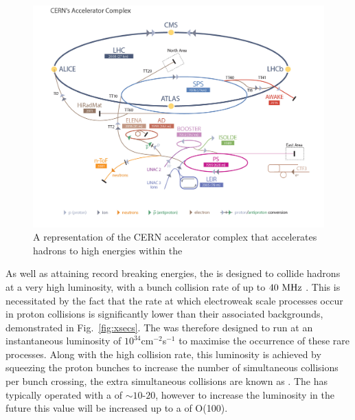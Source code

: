 \begin{figure}
  \includegraphics[width=\largefigwidth]{figs/LHC_default}
  \caption[]%
  {A representation of the CERN accelerator complex that
  accelerates hadrons to high energies within the \LHC
  \cite{stfc:lhc}}%
  \label{fig:lhc}
\end{figure}

As well as attaining record breaking energies, the \LHC is designed to
collide hadrons at a very high luminosity, with a bunch collision rate
of up to $40~\text{MHz}$ \cite{Evans:2008zzb}. This is necessitated by the
fact that the rate at which electroweak scale processes
occur in proton collisions is significantly lower than their
associated backgrounds, demonstrated in Fig.~\ref{fig:xsecs}.
The \LHC was therefore designed to run at an instantaneous
luminosity of $10^{34}$cm$^{-2}$s$^{-1}$ to maximise the occurrence of
these rare processes. Along with the high collision rate, this
luminosity is achieved by squeezing the proton bunches to increase the
number of simultaneous collisions per bunch crossing, the extra
simultaneous collisions are known as \PU.  The \LHC has typically
operated with a \PU of $\sim10\mbox{-}20$, however to increase the
luminosity in the future this value will be increased up to a \PU of
O(100).

